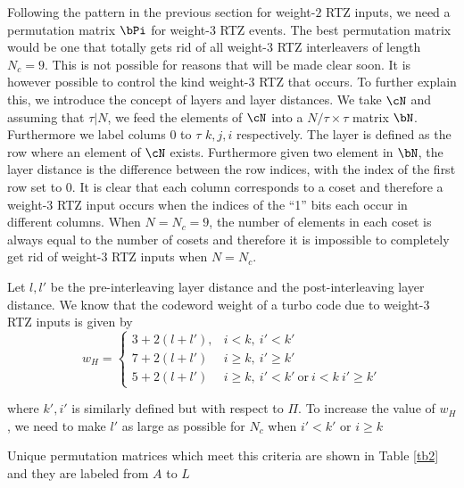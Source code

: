 \documentclass[11pt, oneside, dvipdfmx]{book}
\begin{document}
Following the pattern in the previous section for weight-$2$ RTZ inputs, we need a permutation matrix $\bPi$ for weight-$3$ RTZ events. The best permutation matrix would be one that totally gets rid of all weight-$3$ RTZ interleavers of length $N_c=9$. This is not possible for reasons that will be made clear soon. It is however possible to control the kind weight-$3$ RTZ that occurs. 
To further explain this, we introduce the concept of layers and layer distances. We take $\cN$ and assuming that $\tau | N$, we feed the elements of $\cN$ into a $N/ \tau \times \tau$ matrix $\bN$. Furthermore we label colums $0$ to $\tau$ $k,j,i$ respectively. The layer is defined as the row where an element of $\cN$ exists. Furthermore given two element in $\bN$, the layer distance is the difference between the row indices, with the index of the first row set to $0$. It is clear that each column corresponds to a coset and therefore a weight-$3$ RTZ input occurs when the indices of the ``1'' bits each occur in different columns. When $N=N_c=9$, the number of elements in each coset is always equal to the number of cosets and therefore it is impossible to completely get rid of weight-$3$ RTZ inputs when $N=N_c$.

Let $l,l'$ be the pre-interleaving layer distance and the post-interleaving layer distance.
We know that the codeword weight of a turbo code due to weight-$3$ RTZ inputs is given by
\begin{equation}
w_H=
\begin{cases}
3+2(l+l'),& i<k ,~i'<k'\\
7+2(l+l') & i \geq k,~i' \geq k'\\
5+2(l+l')& i \geq k,~i'<k' ~\text{or}~i<k ~ i' \geq k'
\end{cases}
\label{eq6}
\end{equation}

where $k',i'$ is similarly defined but with respect to $\Pi$. To increase the value of $w_H$ , we need to make $l'$ as large as possible for $N_c$ when $i'<k'$ or $i \geq k$

Unique permutation matrices which meet this criteria are shown in Table \ref{tb2} and they are labeled from $A$ to $L$
\end{document}
